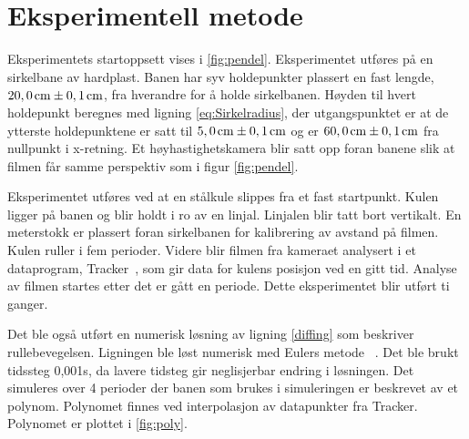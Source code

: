 \section{Eksperimentell metode}
Eksperimentets startoppsett vises i \autoref{fig:pendel}. Eksperimentet utføres på en sirkelbane av hardplast. Banen har syv holdepunkter plassert en fast lengde, $20,0 \hspace{0,5mm}\mathrm{cm} \pm 0,1 \hspace{0,5mm}\mathrm{cm}$, fra hverandre for å holde sirkelbanen. Høyden til hvert holdepunkt beregnes med ligning \eqref{eq:Sirkelradius}, der utgangspunktet er at de ytterste holdepunktene er satt til $5,0 \hspace{0,5mm}\mathrm{cm} \pm 0,1 \hspace{0,5mm}\mathrm{cm}$ og er $60,0 \hspace{0,5mm}\mathrm{cm} \pm 0,1 \hspace{0,5mm}\mathrm{cm}$ fra nullpunkt i x-retning. Et høyhastighetskamera blir satt opp foran banene slik at filmen får samme perspektiv som i figur \autoref{fig:pendel}.

Eksperimentet utføres ved at en stålkule slippes fra et fast startpunkt. Kulen ligger på banen og blir holdt i ro av en linjal. Linjalen blir tatt bort vertikalt. En meterstokk er plassert foran sirkelbanen for kalibrering av avstand på filmen.
Kulen ruller i fem perioder. Videre blir filmen fra kameraet analysert i et dataprogram, Tracker~\cite{Tracker}, som gir data for kulens posisjon ved en gitt tid. Analyse av filmen startes etter det er gått en periode.
Dette eksperimentet blir utført ti ganger.

Det ble også utført en numerisk løsning av ligning \eqref{diffing} som beskriver rullebevegelsen. 
Ligningen ble løst numerisk med Eulers metode ~\cite{Euler}. Det ble brukt tidssteg 0,001s, da lavere tidsteg gir neglisjerbar endring i løsningen. Det simuleres over 4 perioder der banen som brukes i simuleringen er beskrevet av et polynom. Polynomet finnes ved interpolasjon av datapunkter fra Tracker. Polynomet er plottet i \autoref{fig:poly}. 

